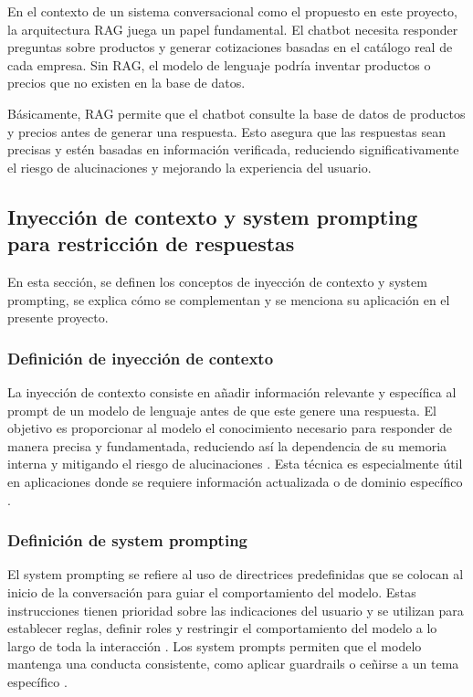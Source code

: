 En el contexto de un sistema conversacional como el propuesto en este proyecto, la arquitectura RAG juega un papel fundamental. El chatbot necesita responder preguntas sobre productos y generar cotizaciones basadas en el catálogo real de cada empresa. Sin RAG, el modelo de lenguaje podría inventar productos o precios que no existen en la base de datos.

Básicamente, RAG permite que el chatbot consulte la base de datos de productos y precios antes de generar una respuesta. Esto asegura que las respuestas sean precisas y estén basadas en información verificada, reduciendo significativamente el riesgo de alucinaciones y mejorando la experiencia del usuario.

\subsection{Inyección de contexto y system prompting para restricción de respuestas}
\label{sec:inyeccion_contexto}

En esta sección, se definen los conceptos de inyección de contexto y system prompting, se explica cómo se complementan y se menciona su aplicación en el presente proyecto.

\subsubsection{Definición de inyección de contexto}
\label{subsec:inyeccion_contexto_definicion}

La inyección de contexto consiste en añadir información relevante y específica al prompt de un modelo de lenguaje antes de que este genere una respuesta. El objetivo es proporcionar al modelo el conocimiento necesario para responder de manera precisa y fundamentada, reduciendo así la dependencia de su memoria interna y mitigando el riesgo de alucinaciones \cite{mukherjee2025augmenting}. Esta técnica es especialmente útil en aplicaciones donde se requiere información actualizada o de dominio específico \cite{mukherjee2025augmenting}.

\subsubsection{Definición de system prompting}
\label{subsec:system_prompting_definicion}

El system prompting se refiere al uso de directrices predefinidas que se colocan al inicio de la conversación para guiar el comportamiento del modelo. Estas instrucciones tienen prioridad sobre las indicaciones del usuario y se utilizan para establecer reglas, definir roles y restringir el comportamiento del modelo a lo largo de toda la interacción \cite{neumann2025position}. Los system prompts permiten que el modelo mantenga una conducta consistente, como aplicar guardrails o ceñirse a un tema específico \cite{neumann2025position}.

